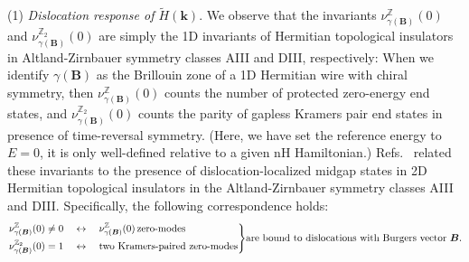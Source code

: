 \documentclass[prb,reprint,twocolumn,preprintnumbers,amsmath,amssymb,showpacs,nofootinbib,superscriptaddress]{revtex4-2}
\newenvironment{rcases}
  {\left.\begin{aligned}}
  {\end{aligned}\right\rbrace}
\newcommand{\bs}[1]{\boldsymbol{#1}}
\begin{document}
(1) \emph{Dislocation response of $\tilde{H}(\bs{k})$}. We observe that the invariants $\nu^{\mathbb{Z}}_{\gamma(\bs{B})}(0)$ and $\nu^{\mathbb{Z}_2}_{\gamma(\bs{B})}(0)$ are simply the 1D invariants of Hermitian topological insulators in Altland-Zirnbauer symmetry classes AIII and DIII, respectively: When we identify $\gamma(\bs{B})$ as the Brillouin zone of a 1D Hermitian wire with chiral symmetry, then $\nu^{\mathbb{Z}}_{\gamma(\bs{B})}(0)$ counts the number of protected zero-energy end states, and $\nu^{\mathbb{Z}_2}_{\gamma(\bs{B})}(0)$ counts the parity of gapless Kramers pair end states in presence of time-reversal symmetry. (Here, we have set the reference energy to $E=0$, it is only well-defined relative to a given nH Hamiltonian.) Refs.~ related these invariants to the presence of dislocation-localized midgap states in 2D Hermitian topological insulators in the Altland-Zirnbauer symmetry classes AIII and DIII. Specifically, the following correspondence holds:
\begin{equation} \label{eq: hermcorrespondenceran}
\begin{rcases}
  \nu^{\mathbb{Z}}_{\gamma(\bs{B})}(0) \neq 0 \quad &\leftrightarrow \quad \nu^{\mathbb{Z}}_{\gamma(\bs{B})}(0) \, \text{zero-modes} \\
    \nu^{\mathbb{Z}_2}_{\gamma(\bs{B})}(0) = 1 \quad &\leftrightarrow \quad \text{two Kramers-paired zero-modes}
\end{rcases} \text{are bound to dislocations with Burgers vector } \bs{B}.
\end{equation}
\end{document}

